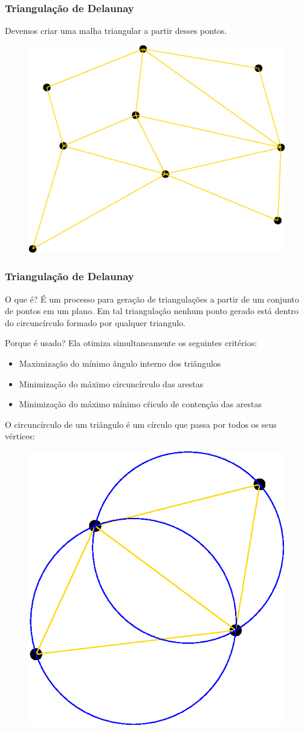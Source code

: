 \documentclass[brazil]{beamer}
\begin{document}
\begin{frame}
  \frametitle{Triangulação de Delaunay}
  Devemos criar uma malha triangular a partir desses pontos.
  \begin{figure}
    \includegraphics[width=0.5\linewidth]{dela2.eps}
  \end{figure}
\end{frame}

\begin{frame}
  \frametitle{Triangulação de Delaunay}

  \begin{block}{O que é?}
    É um processo para geração de triangulações a partir de um conjunto de pontos em um plano. Em tal triangulação nenhum ponto gerado está dentro do circuncírculo formado por qualquer triangulo.
  \end{block}

  \begin{block}{Porque é usado?}
    Ela otimiza simultaneamente os seguintes critérios:
    \begin{itemize}
      \item Maximização do mínimo ângulo interno dos triângulos
      \item Minimização do máximo circuncírculo das arestas
      \item Minimização do máximo mínimo cŕiculo de contenção das arestas
    \end{itemize}
  \end{block}
\end{frame}


\begin{frame}
  O circuncírculo de um triângulo é um círculo que passa por todos os seus vértices:

  \begin{figure}
    \includegraphics[width=0.3\linewidth]{dela3.eps}
  \end{figure}


\end{frame}
\end{document}
